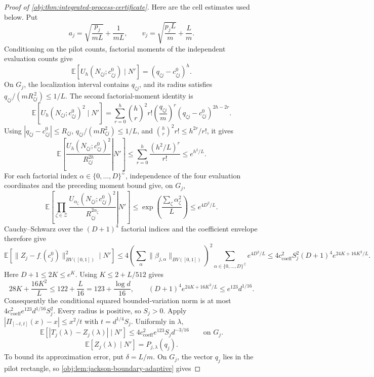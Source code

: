 \documentclass[11pt]{article}
\begin{document}
\begin{proof}[Proof of \cref{obj:thm:integrated-process-certificate}]
Here are the cell estimates used below. Put
\[
a_j=\sqrt{\frac{p_j}{mL}}+\frac1{mL},
\qquad
v_j=\sqrt{\frac{p_jL}{m}}+\frac Lm.
\]
Conditioning on the pilot counts, factorial moments of the independent evaluation counts give
\[
\mathbb E\!\left[U_h(N_{\zeta j};c^0_{\zeta j})\mid N'\right]
 =(q_{\zeta j}-c^0_{\zeta j})^h.
\]
On \(G_j\), the localization interval contains \(q_{\zeta j}\), and its radius satisfies
\(q_{\zeta j}/(mR_{\zeta j}^{\,2})\leq1/L\). The second factorial-moment identity is
\[
\mathbb E\!\left[U_h(N_{\zeta j};c^0_{\zeta j})^2\mid N'\right]
 =\sum_{r=0}^{h}{h\choose r}^{\!2}r!
   \left(\frac{q_{\zeta j}}m\right)^r
   (q_{\zeta j}-c^0_{\zeta j})^{2h-2r}.
\]
Using \(|q_{\zeta j}-c^0_{\zeta j}|\leq R_{\zeta j}\), \(q_{\zeta j}/(mR_{\zeta j}^2)\leq1/L\), and \({h\choose r}^2r!\leq h^{2r}/r!\), it gives
\[
\mathbb E\!\left[\left.
 \frac{U_h(N_{\zeta j};c^0_{\zeta j})^2}{R_{\zeta j}^{2h}}
 \right|N'\right]
 \leq\sum_{r=0}^{h}\frac{(h^2/L)^r}{r!}
 \leq e^{h^2/L}.
\]
For each factorial index \(\alpha\in\{0,\ldots,D\}^{\mathcal Z}\), independence of the four evaluation coordinates and the preceding moment bound give, on \(G_j\),
\[
\mathbb E\!\left[\left.
\prod_{\zeta\in\mathcal Z}
\frac{U_{\alpha_\zeta}(N_{\zeta j};c^0_{\zeta j})^2}
     {R_{\zeta j}^{2\alpha_\zeta}}
\right|N'\right]
\leq \exp\!\left(\frac{\sum_\zeta\alpha_\zeta^2}{L}\right)
\leq e^{4D^2/L}.
\]
Cauchy–Schwarz over the \((D+1)^4\) factorial indices and the coefficient envelope therefore give
\[
\mathbb E\!\left[\|Z_j-f_\cdot(c_j^0)\|_{BV([0,1])}^2\mid N'\right]
\leq 4\left(\sum_\alpha\|\beta_{j,\alpha}\|_{BV([0,1])}\right)^2
       \sum_{\alpha\in\{0,\ldots,D\}^{\mathcal Z}}e^{4D^2/L}
\leq 4c_{\mathrm{coeff}}^2S_j^2(D+1)^4
       e^{24K+16K^2/L}.
\]
Here \(D+1\leq2K\leq e^K\). Using \(K\leq2+L/512\) gives
\[
28K+\frac{16K^2}{L}\leq122+\frac L{16}
=123+\frac{\log d}{16},
\qquad
(D+1)^4e^{24K+16K^2/L}\leq e^{123}d^{1/16}.
\]
Consequently the conditional squared bounded-variation norm is at most \(4c_{\mathrm{coeff}}^2e^{123}d^{1/16}S_j^2\). Every radius is positive, so \(S_j>0\). Apply \(|\Pi_{[-t,t]}(x)-x|\leq x^2/t\) with \(t=d^{1/4}S_j\). Uniformly in \(\lambda\),
\[
\mathbb E\!\left[|T_j(\lambda)-Z_j(\lambda)|\mid N'\right]
 \leq 4c_{\mathrm{coeff}}^2e^{123}S_jd^{-3/16}
 \qquad\text{on }G_j.
\]
\[
\mathbb E[Z_j(\lambda)\mid N']=P_{j,\lambda}(q_j).
\]
To bound its approximation error, put \(\delta=L/m\). On \(G_j\), the vector \(q_j\) lies in the pilot rectangle, so \cref{obj:lem:jackson-boundary-adaptive} gives

\end{proof}
\end{document}
